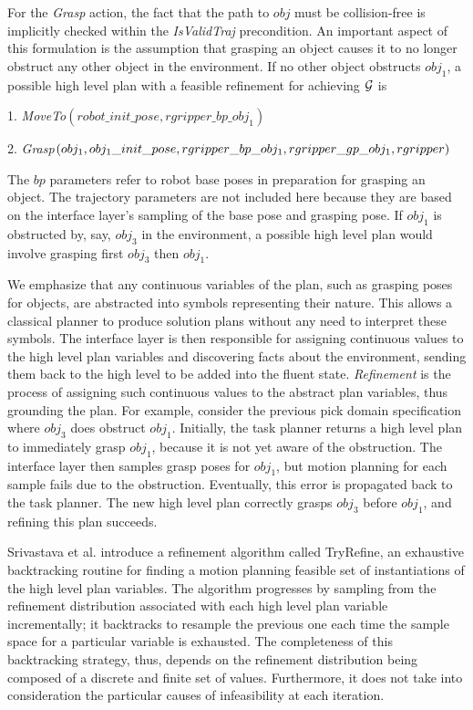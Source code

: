 For the \emph{Grasp} action, the fact that the path to $obj$ must be collision-free is
implicitly checked within the \emph{IsValidTraj} precondition. An important aspect of
this formulation is the assumption that grasping an object causes it to no longer
obstruct any other object in the environment. If no other object obstructs $obj_{1}$,
a possible high level plan with a feasible refinement for achieving $\mathcal{G}$ is
\begin{tightlist}
\item[1.] \emph{MoveTo}$(robot\_init\_pose, rgripper\_bp\_obj_{1})$
\item[2.] \emph{Grasp}$(obj_{1}, obj_{1}\_init\_pose, rgripper\_bp\_obj_{1},\\rgripper\_gp\_obj_{1}, rgripper)$
\end{tightlist}

The $bp$ parameters refer to robot base poses in preparation for grasping an object.
The trajectory parameters are not included here because they are based on the interface layer's
sampling of the base pose and grasping pose. If $obj_{1}$ is
obstructed by, say, $obj_{3}$ in the environment, a possible high level plan would involve
grasping first $obj_{3}$ then $obj_{1}$.

We emphasize that any continuous variables of the plan, such as grasping poses for
objects, are abstracted into symbols representing their nature. This allows a
classical planner to produce solution plans without any need to interpret these
symbols. The interface layer is then responsible for assigning continuous values to
the high level plan variables and discovering facts about the environment, sending
them back to the high level to be added into the fluent state. \emph{Refinement} is the
process of assigning such continuous values to the abstract plan variables, thus grounding the plan. 
For example, consider the previous pick domain specification where $obj_{3}$ does obstruct $obj_{1}$.
Initially, the task planner returns a high level plan to immediately grasp $obj_{1}$, because
it is not yet aware of the obstruction. The interface layer then samples grasp poses
for $obj_{1}$, but motion planning for each sample fails due to the obstruction. Eventually,
this error is propagated back to the task planner. The new high level plan correctly
grasps $obj_{3}$ before $obj_{1}$, and refining this plan succeeds.

Srivastava et al. introduce a refinement algorithm called TryRefine, an exhaustive backtracking routine for
finding a motion planning feasible set of instantiations of the high level plan
variables. The algorithm progresses by sampling from the refinement
distribution associated with each high level plan variable incrementally; it backtracks
to resample the previous one each time the sample space for a particular variable
is exhausted. The completeness of this backtracking strategy, thus, depends on the refinement distribution
being composed of a discrete and finite set of values. Furthermore, it does not take into consideration
the particular causes of infeasibility at each iteration.